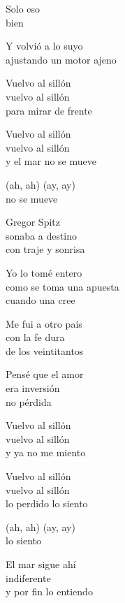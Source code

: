 \begin{lyrics}
Solo eso\\
bien

Y volvió a lo suyo\\
ajustando un motor ajeno

Vuelvo al sillón\\
vuelvo al sillón\\
para mirar de frente

Vuelvo al sillón\\
vuelvo al sillón\\
y el mar no se mueve

(ah, ah)
(ay, ay)\\
no se mueve

Gregor Spitz\\
sonaba a destino\\
con traje y sonrisa

Yo lo tomé entero\\
como se toma una apuesta\\
cuando una cree

Me fui a otro país\\
con la fe dura\\
de los veintitantos

Pensé que el amor\\
era inversión\\
no pérdida

Vuelvo al sillón\\
vuelvo al sillón\\
y ya no me miento

Vuelvo al sillón\\
vuelvo al sillón\\
lo perdido lo siento

(ah, ah)
(ay, ay)\\
lo siento

El mar sigue ahí\\
indiferente\\
y por fin lo entiendo
\end{lyrics}

